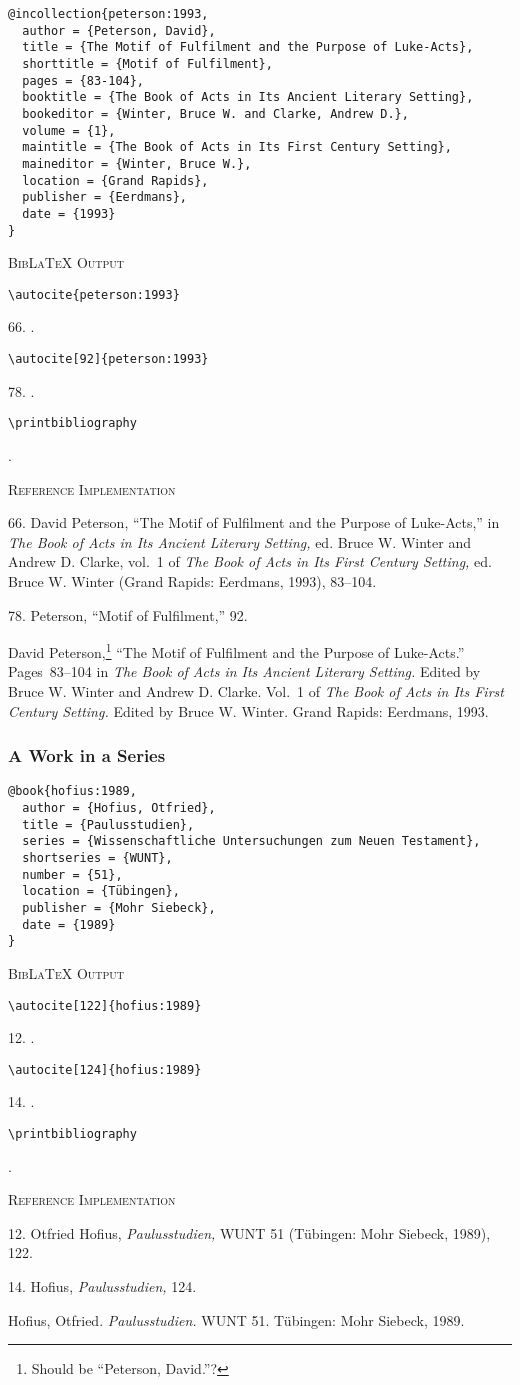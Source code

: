\documentclass[a4paper]{article}
\newcommand\citetest[5]{%
  {\textsc{BibLaTeX Output}\par
   \nobreak
   \texttt{\textbackslash autocite[#2]\{#5\}}\par
   \color{biblatex-colour}
   #1. \cite[#2]{#5}.\par
   \color{black}
   \texttt{\textbackslash autocite[#4]\{#5\}}\par
   \color{biblatex-colour}
   #3. \cite[#4]{#5}.\par
   \color{black}
   \texttt{\textbackslash printbibliography}\par
   \color{biblatex-colour}
   \hangindent\bibindent\bibentrycite{#5}.\par}}
\newcommand\citetestnpf[4]{%
  {\textsc{BibLaTeX Output}\par
   \nobreak
   \texttt{\textbackslash autocite\{#4\}}\par
   \color{biblatex-colour}
   #1. \cite{#4}.\par
   \color{black}
   \texttt{\textbackslash autocite[#3]\{#4\}}\par
   \color{biblatex-colour}
   #2. \cite[#3]{#4}.\par
   \color{black}
   \texttt{\textbackslash printbibliography}\par
   \color{biblatex-colour}
   \hangindent\bibindent\bibentrycite{#4}.\par}}
\newenvironment{refimp}{%
  \begin{minipage}{\linewidth}
    \setlength{\parskip}{1ex}
    \textsc{Reference Implementation}\par
    \nobreak
    \color{reference-colour}
}{\end{minipage}}
\begin{document}
\begin{lstlisting}
@incollection{peterson:1993,
  author = {Peterson, David},
  title = {The Motif of Fulfilment and the Purpose of Luke-Acts},
  shorttitle = {Motif of Fulfilment},
  pages = {83-104},
  booktitle = {The Book of Acts in Its Ancient Literary Setting},
  bookeditor = {Winter, Bruce W. and Clarke, Andrew D.},
  volume = {1},
  maintitle = {The Book of Acts in Its First Century Setting},
  maineditor = {Winter, Bruce W.},
  location = {Grand Rapids},
  publisher = {Eerdmans},
  date = {1993}
}
\end{lstlisting}  

\citetestnpf{66}{78}{92}{peterson:1993}

\begin{refimp}
  66. David Peterson, “The Motif of Fulfilment and the Purpose of Luke-Acts,”
  in \emph{The Book of Acts in Its Ancient Literary Setting,} ed. Bruce W.
  Winter and Andrew D. Clarke, vol.~1 of \emph{The Book of Acts in Its First
  Century Setting,} ed. Bruce W. Winter (Grand Rapids: Eerdmans, 1993),
  83–104.

  78. Peterson, “Motif of Fulfilment,” 92.

  \hangindent\bibindent David Peterson,\footnote{Should be “Peterson,
  David.”?} “The Motif of Fulfilment and the Purpose of Luke-Acts.”
  Pages~83–104 in \emph{The Book of Acts in Its Ancient Literary Setting.}
  Edited by Bruce W. Winter and Andrew D. Clarke. Vol.~1 of \emph{The Book of
  Acts in Its First Century Setting.} Edited by Bruce W. Winter. Grand Rapids:
  Eerdmans, 1993.
\end{refimp}

\subsubsection{A Work in a Series}

\begin{lstlisting}
@book{hofius:1989,
  author = {Hofius, Otfried},
  title = {Paulusstudien},
  series = {Wissenschaftliche Untersuchungen zum Neuen Testament},
  shortseries = {WUNT},
  number = {51},
  location = {Tübingen},
  publisher = {Mohr Siebeck},
  date = {1989}
}
\end{lstlisting}  

\citetest{12}{122}{14}{124}{hofius:1989}

\begin{refimp}
  12. Otfried Hofius, \emph{Paulusstudien,} WUNT 51 (Tübingen: Mohr Siebeck,
  1989), 122.

  14. Hofius, \emph{Paulusstudien,} 124.

  Hofius, Otfried. \emph{Paulusstudien.} WUNT 51. Tübingen: Mohr Siebeck,
  1989.
\end{refimp}
\end{document}
